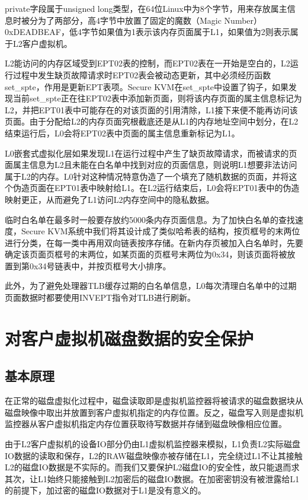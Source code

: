 private字段属于unsigned long类型，在64位Linux中为8个字节，用来存放属主信息时被分为了两部分，高4字节中放置了固定的魔数（Magic Number）0xDEADBEAF，低4字节如果值为1表示该内存页面属于L1，如果值为2则表示属于L2客户虚拟机。

L2能访问的内存区域受到EPT02表的控制，而EPT02表在一开始是空白的，L2运行过程中发生缺页故障请求时EPT02表会被动态更新，其中必须经历函数set\_spte，作用是更新EPT表项。Secure KVM在set\_spte中设置了钩子，如果发现当前set\_spte正在往EPT02表中添加新页面，则将该内存页面的属主信息标记为L2，并把EPT01表中可能存在的对该页面的引用清除，L1接下来便不能再访问该页面。由于分配给L2的内存页面究根截底还是从L1的内存地址空间中划分，在L2结束运行后，L0会将EPT02表中页面的属主信息重新标记为L1。

L0嵌套式虚拟化层如果发现L1在运行过程中产生了缺页故障请求，而被请求的页面属主信息为L2且未能在白名单中找到对应的页面信息，则说明L1想要非法访问属于L2的内存。L0针对这种情况特意伪造了一个填充了随机数据的页面，并将这个伪造页面在EPT01表中映射给L1。在L2运行结束后，L0会将EPT01表中的伪造映射更正，从而避免了L1访问L2内存空间中的隐私数据。

临时白名单在最多时一般要存放约5000条内存页面信息。为了加快白名单的查找速度，Secure KVM系统中我们将其设计成了类似哈希表的结构，按页框号的末两位进行分类，在每一类中再用双向链表按序存储。在新内存页被加入白名单时，先要确定该页面页框号的末两位，如某页面的页框号末两位为0x34，则该页面将被放置到第0x34号链表中，并按页框号大小排序。

此外，为了避免处理器TLB缓存过期的白名单信息，L0每次清理白名单中的过期页面数据时都要使用INVEPT指令对TLB进行刷新。

\section{对客户虚拟机磁盘数据的安全保护}

\subsection{基本原理}

在正常的磁盘虚拟化过程中，磁盘读取即是虚拟机监控器将被请求的磁盘数据块从磁盘映像中取出并放置到客户虚拟机指定的内存位置。反之，磁盘写入则是虚拟机监控器从客户虚拟机指定内存位置获取待写数据并存储到磁盘映像相应位置。

由于L2客户虚拟机的设备IO部分仍由L1虚拟机监控器来模拟，L1负责L2实际磁盘IO数据的读取和保存，L2的RAW磁盘映像亦被存储在L1，完全绕过L1不让其接触L2的磁盘IO数据是不实际的。而我们又要保护L2磁盘IO的安全性，故只能退而求其次，让L1始终只能接触到L2加密后的磁盘IO数据。在加密密钥没有被泄露给L1的前提下，加过密的磁盘IO数据对于L1是没有意义的。

